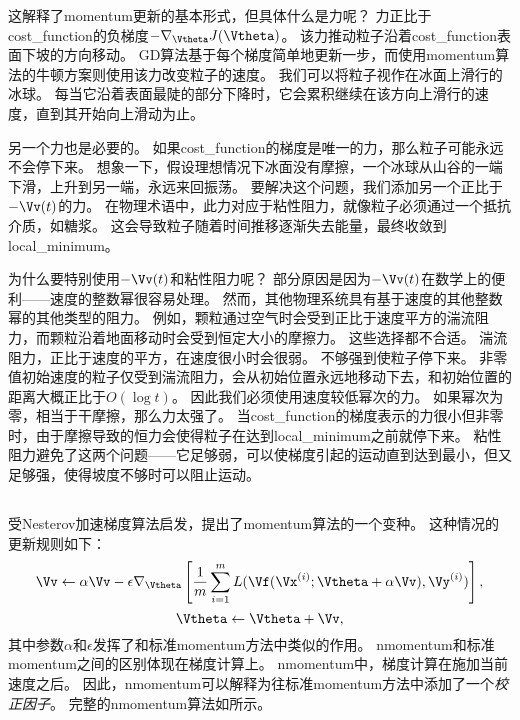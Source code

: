 这解释了\gls{momentum}更新的基本形式，但具体什么是力呢？
力正比于\gls{cost_function}的负梯度$-\nabla_{\Vtheta} J(\Vtheta)$。
该力推动粒子沿着\gls{cost_function}表面下坡的方向移动。
\gls{GD}算法基于每个梯度简单地更新一步，而使用\gls{momentum}算法的牛顿方案则使用该力改变粒子的速度。
我们可以将粒子视作在冰面上滑行的冰球。
每当它沿着表面最陡的部分下降时，它会累积继续在该方向上滑行的速度，直到其开始向上滑动为止。


另一个力也是必要的。
如果\gls{cost_function}的梯度是唯一的力，那么粒子可能永远不会停下来。
想象一下，假设理想情况下冰面没有摩擦，一个冰球从山谷的一端下滑，上升到另一端，永远来回振荡。
要解决这个问题，我们添加另一个正比于$-\Vv(t)$的力。
在物理术语中，此力对应于粘性阻力，就像粒子必须通过一个抵抗介质，如糖浆。
这会导致粒子随着时间推移逐渐失去能量，最终收敛到\gls{local_minimum}。


为什么要特别使用$-\Vv(t)$和粘性阻力呢？
部分原因是因为$-\Vv(t)$在数学上的便利——速度的整数幂很容易处理。
然而，其他物理系统具有基于速度的其他整数幂的其他类型的阻力。
例如，颗粒通过空气时会受到正比于速度平方的湍流阻力，而颗粒沿着地面移动时会受到恒定大小的摩擦力。
这些选择都不合适。
湍流阻力，正比于速度的平方，在速度很小时会很弱。
不够强到使粒子停下来。
非零值初始速度的粒子仅受到湍流阻力，会从初始位置永远地移动下去，和初始位置的距离大概正比于$O(\log t)$。
因此我们必须使用速度较低幂次的力。
如果幂次为零，相当于干摩擦，那么力太强了。
当\gls{cost_function}的梯度表示的力很小但非零时，由于摩擦导致的恒力会使得粒子在达到\gls{local_minimum}之前就停下来。
粘性阻力避免了这两个问题——它足够弱，可以使梯度引起的运动直到达到最小，但又足够强，使得坡度不够时可以阻止运动。


\subsection{}
\label{sec:nesterov_momentum}
受Nesterov加速梯度算法\citep{Nesterov83b,Nesterov03}启发，\cite{sutskeverimportance}提出了\gls{momentum}算法的一个变种。
这种情况的更新规则如下：
\begin{equation}
    \Vv \leftarrow \alpha\Vv - \epsilon \nabla_{\Vtheta} \left[
    \frac{1}{m} \sum_{i=1}^m L( \Vf(\Vx^{(i)}; \Vtheta + \alpha \Vv), \Vy^{(i)} )
 \right],
\end{equation}
\begin{equation}
    \Vtheta \leftarrow \Vtheta + \Vv ,
\end{equation}
其中参数$\alpha$和$\epsilon$发挥了和标准\gls{momentum}方法中类似的作用。 
\gls{nmomentum}和标准\gls{momentum}之间的区别体现在梯度计算上。
\gls{nmomentum}中，梯度计算在施加当前速度之后。
因此，\gls{nmomentum}可以解释为往标准\gls{momentum}方法中添加了一个\emph{校正因子}。
完整的\gls{nmomentum}算法如所示。


